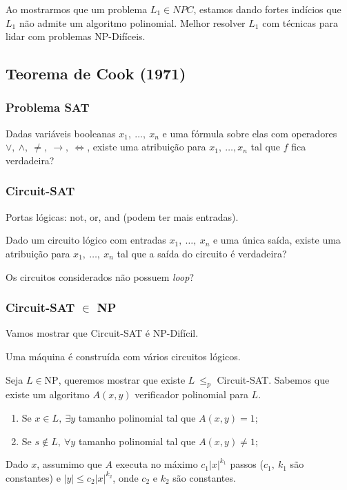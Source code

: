 \documentclass[a4paper,oneside,article,table]{article}
\begin{document}
        Ao mostrarmos que um problema $L_1 \in NPC$, estamos dando fortes indícios que $L_1$ não admite um algoritmo polinomial.
        Melhor resolver $L_1$ com técnicas para lidar com problemas NP-Difíceis.

        \subsection{Teorema de Cook (1971)}
            \subsubsection{Problema SAT}
                Dadas variáveis booleanas $x_1,~\ldots,~x_n$ e uma fórmula sobre elas com operadores $\lor,~\land,~\ne,~\rightarrow,~\iff$, existe uma atribuição para $x_1,~\ldots, x_n$ tal que $f$ fica verdadeira?

            \subsubsection{Circuit-SAT}
            Portas lógicas: not, or, and (podem ter mais entradas).

            Dado um circuito lógico com entradas $x_1,~\ldots,~x_n$ e uma única saída, existe uma atribuição para $x_1,~\ldots,~x_n$ tal que a saída do circuito é verdadeira?

            Os circuitos considerados não possuem \textit{loop}?


            \subsubsection{Circuit-SAT $\in$ NP}
            Vamos mostrar que Circuit-SAT é NP-Difícil.

            
            Uma máquina é construída com vários circuitos lógicos.

            Seja $L \in \textrm{NP}$, queremos mostrar que existe $L~{\leq}_p$ Circuit-SAT.
            Sabemos que existe um algoritmo $A(x,y)$ verificador polinomial para $L$.
            \begin{enumerate}
                \item Se $x \in L,~\exists y$ tamanho polinomial tal que $A(x,y) = 1$;
                \item Se $s \notin L,~\forall y$ tamanho polinomial tal que $A(x,y) \neq 1$;
            \end{enumerate}
            Dado $x$, assumimo que $A$ executa no máximo $c_1|x|^{k_1}$ passos ($c_1,~k_1$ são constantes) e $|y| \leq c_2|x|^{k_2}$, onde $c_2$ e $k_2$ são constantes.
\end{document}
